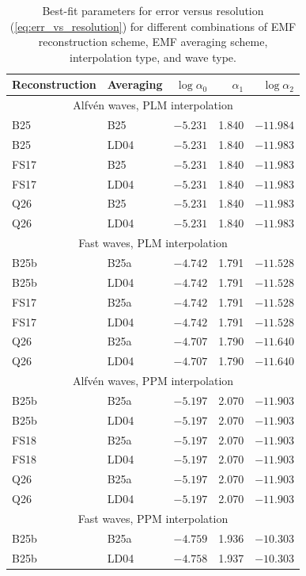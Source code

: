 \begin{table}
\centering
\caption{Best-fit parameters for error versus resolution (\autoref{eq:err_vs_resolution}) for different combinations of EMF reconstruction scheme, EMF averaging scheme, interpolation type, and wave type.
\label{tab:linear_convergence}}
\begin{tabular}{llrrr}
\hline\hline
Reconstruction & Averaging & $\log \alpha_0$ & $\alpha_1$ & $\log \alpha_2$ \\
\hline
\multicolumn{5}{c}{Alfv\'en waves, PLM interpolation} \\
\hline
B25 & B25 & $-5.231$ & 1.840 & $-11.984$ \\
B25 & LD04 & $-5.231$ & 1.840 & $-11.983$ \\
FS17 & B25 & $-5.231$ & 1.840 & $-11.983$ \\
FS17 & LD04 & $-5.231$ & 1.840 & $-11.983$ \\
Q26 & B25 & $-5.231$ & 1.840 & $-11.983$ \\
Q26 & LD04 & $-5.231$ & 1.840 & $-11.983$ \\
\hline
\multicolumn{5}{c}{Fast waves, PLM interpolation} \\
\hline
B25b & B25a & $-4.742$ & 1.791 & $-11.528$ \\
B25b & LD04 & $-4.742$ & 1.791 & $-11.528$ \\
FS17 & B25a & $-4.742$ & 1.791 & $-11.528$ \\
FS17 & LD04 & $-4.742$ & 1.791 & $-11.528$ \\
Q26 & B25a & $-4.707$ & 1.790 & $-11.640$ \\
Q26 & LD04 & $-4.707$ & 1.790 & $-11.640$ \\
\hline
\multicolumn{5}{c}{Alfv\'en waves, PPM interpolation} \\
\hline
B25b & B25a & $-5.197$ & 2.070 & $-11.903$ \\
B25b & LD04 & $-5.197$ & 2.070 & $-11.903$ \\
FS18 & B25a & $-5.197$ & 2.070 & $-11.903$ \\
FS18 & LD04 & $-5.197$ & 2.070 & $-11.903$ \\
Q26 & B25a & $-5.197$ & 2.070 & $-11.903$ \\
Q26 & LD04 & $-5.197$ & 2.070 & $-11.903$ \\
\hline
\multicolumn{5}{c}{Fast waves, PPM interpolation} \\
\hline
B25b & B25a & $-4.759$ & 1.936 & $-10.303$ \\
B25b & LD04 & $-4.758$ & 1.937 & $-10.303$ \\

\end{tabular}
\end{table}
